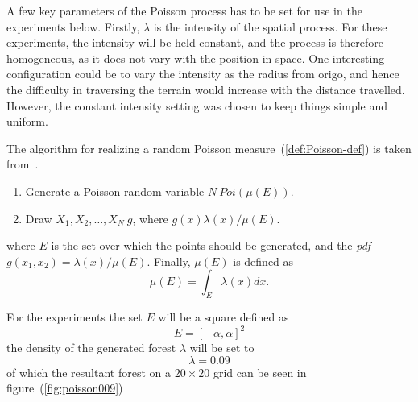 A few key parameters of the Poisson process has to be set for use in the
experiments below. Firstly, \(\lambda\) is the intensity of the spatial process.
For these experiments, the intensity will be held constant, and the process is
therefore homogeneous, as it does not vary with the position in space. One
interesting configuration could be to vary the intensity as the radius from
origo, and hence the difficulty in traversing the terrain would increase with
the distance travelled. However, the constant intensity setting was chosen to
keep things simple and uniform.

The algorithm for realizing a random Poisson measure~(\ref{def:Poisson-def}) is
taken from~\cite[Definition 1.1.1,p~34]{kroeseSpatialProcessGeneration}.

\begin{definition}
  \label{def:Poisson-def}
  \begin{enumerate}
  \item Generate a Poisson random variable \(N ~ Poi(\mu(E))\).
  \item Draw \(X_1,X_2,\ldots,X_N ~ g\), where \(g(x) \lambda(x)/ \mu(E)\).
  \end{enumerate}
\end{definition}
where \(E\) is the set over which the points should be generated, and the
\textit{pdf} \(g(x_1, x_2) = \lambda(x)/\mu(E)\). Finally, \(\mu(E)\) is defined
as
\[
  \mu(E) = \int_{E} \lambda(x) dx.
\]

For the experiments the set \(E\) will be a square defined as
\[
  E = [-\alpha, \alpha]^2
\]
the density of the generated forest \(\lambda\) will be set to
\[
  \lambda = 0.09
\]
of which the resultant forest on a \(20 \times 20\) grid can be seen in
figure~(\ref{fig:poisson009})

